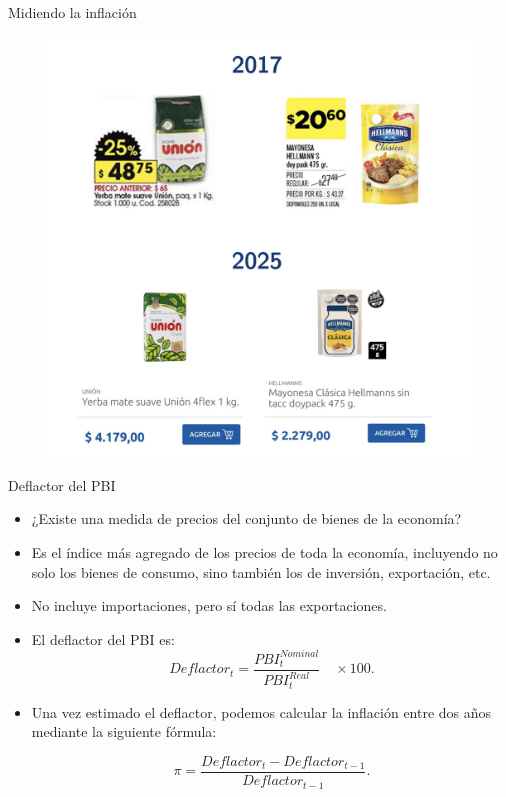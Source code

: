 \documentclass{beamer}
\begin{document}
\begin{frame}{Midiendo la inflación}
\begin{figure} [H]  
\includegraphics[scale=0.17]{../Figures/M19.5.jpg}
\end{figure}
\end{frame}

\begin{frame}{Deflactor del PBI }
\begin{itemize}
\item ¿Existe una medida de precios del conjunto de bienes de la economía? 
\item Es el índice más agregado de los precios de toda la economía, incluyendo no solo los bienes de consumo, sino también los de inversión, exportación, etc. 
\item No incluye importaciones, pero sí todas las exportaciones.
\item El deflactor del PBI es:  \vspace{1mm}
\begin{equation*}
    Deflactor_{t}=\frac{PBI_{t}^{Nominal}}{PBI_{t}^{Real}}\quad \times 100.
\end{equation*}

\item Una vez estimado el deflactor, podemos calcular la inflación entre dos años mediante la siguiente fórmula:

\begin{equation*}
\pi =\frac{Deflactor_{t} - Deflactor_{t-1}}{Deflactor_{t-1}}.
\end{equation*}

\end{itemize}
\end{frame}
\end{document}
